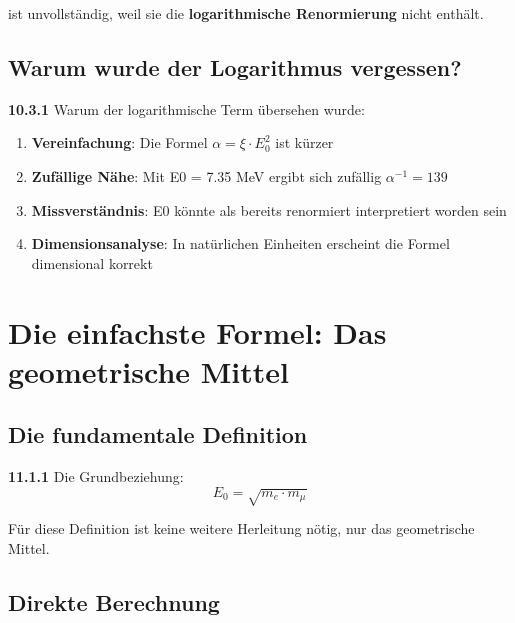 ist unvollständig, weil sie die \textbf{logarithmische Renormierung} nicht enthält.

\subsection{Warum wurde der Logarithmus vergessen?}

\begin{tcolorbox}[colback=yellow!5!white,colframe=orange!75!black,title=Mögliche Gründe]
	\noindent \textbf{10.3.1} Warum der logarithmische Term übersehen wurde:
	\begin{enumerate}
		\item \textbf{Vereinfachung}: Die Formel $\alpha = \xi \cdot E_0^2$ ist kürzer
		\item \textbf{Zufällige Nähe}: Mit E0 = 7.35 MeV ergibt sich zufällig $\alpha^{-1} = 139$
		\item \textbf{Missverständnis}: E0 könnte als bereits renormiert interpretiert worden sein
		\item \textbf{Dimensionsanalyse}: In natürlichen Einheiten erscheint die Formel dimensional korrekt
	\end{enumerate}
\end{tcolorbox}

\section{Die einfachste Formel: Das geometrische Mittel}

\subsection{Die fundamentale Definition}

\begin{tcolorbox}[colback=yellow!10!white,colframe=red!75!black,title=\textbf{Die einfachste Formel}]
	\noindent \textbf{11.1.1} Die Grundbeziehung:
	\begin{equation}
		\boxed{E_0 = \sqrt{m_e \cdot m_\mu}}
	\end{equation}
	
	Für diese Definition ist keine weitere Herleitung nötig, nur das geometrische Mittel.
\end{tcolorbox}

\subsection{Direkte Berechnung}

